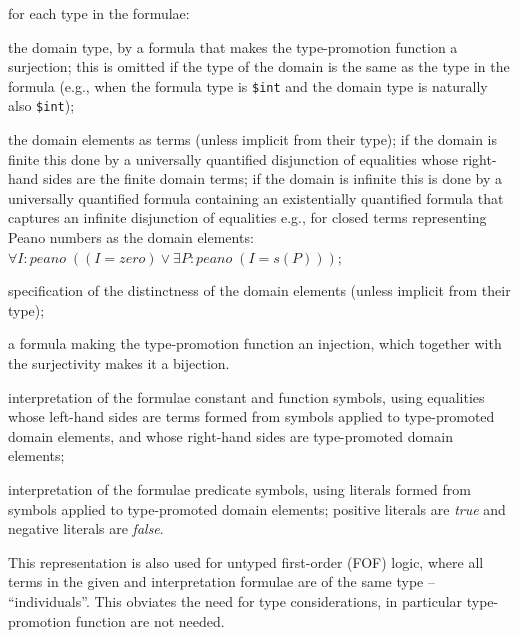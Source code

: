 \documentclass[letterpaper]{article}
\newcommand{\smalltt}[1]{\small \texttt{#1}}
\newenvironment{packed_itemize}{
\vspace*{-0.2em}
\begin{itemize}
\setlength{\partopsep}{0pt}
\setlength{\itemsep}{1pt}
\setlength{\parskip}{0pt}
\setlength{\parsep}{0pt}
}{\end{itemize}}
\begin{document}
\begin{packed_itemize}
\item for each type in the formulae:
      \begin{packed_itemize}
      \item the domain type, by a formula that makes the type-promotion function a surjection; 
            this is omitted if the type of the domain is the same as the type in the formula
            (e.g., when the formula type is \smalltt{\$int} and the domain type is naturally 
            also \smalltt{\$int});
      \item the domain elements as terms (unless implicit from their type); if the domain is
            finite this done by a universally quantified disjunction of equalities whose 
            right-hand sides are the finite domain terms; if the domain is infinite this is
            done by a universally quantified formula containing an existentially quantified 
            formula that captures an infinite disjunction of equalities e.g., for closed terms 
            representing Peano numbers as the domain elements:\\
            \hspace*{0.5cm}$\forall I{:}peano\;((I = zero) \vee \exists P{:}peano\;(I = s(P)))$;
      \item specification of the distinctness of the domain elements (unless implicit from their
            type);
      \item a formula making the type-promotion function an injection,
            which together with the surjectivity makes it a bijection.
      \end{packed_itemize}
\item interpretation of the formulae constant and function symbols, using equalities whose 
      left-hand sides are terms formed from symbols applied to type-promoted domain elements, 
      and whose right-hand sides are type-promoted domain elements;
\item interpretation of the formulae predicate symbols, using literals formed from symbols applied
      to type-promoted domain elements; positive literals are {\em true} and negative literals 
      are {\em false}.
\end{packed_itemize}
This representation is also used for untyped first-order (FOF) logic, where all terms in the given 
and interpretation formulae are of the same type – ``individuals''. 
This obviates the need for type considerations, in particular type-promotion function are not 
needed.
\end{document}
